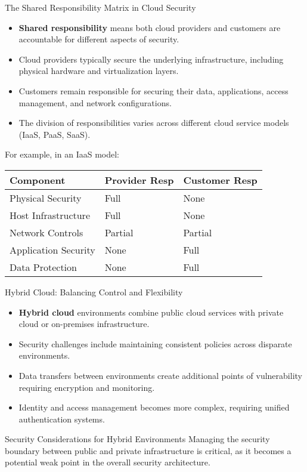 \documentclass{beamer}
\begin{document}
\begin{frame}{The Shared Responsibility Matrix in Cloud Security}
    \begin{itemize}
    \item \textbf{Shared responsibility} means both cloud providers and customers are accountable for different aspects of security.
    \item Cloud providers typically secure the underlying infrastructure, including physical hardware and virtualization layers.
    \item Customers remain responsible for securing their data, applications, access management, and network configurations.
    \item The division of responsibilities varies across different cloud service models (IaaS, PaaS, SaaS). 
    \end{itemize}
    For example, in an IaaS model:
    \begin{table}
    \begin{tabular}{lll}
    \toprule
    \textbf{Component} & \textbf{Provider Resp} & \textbf{Customer Resp} \\
    \midrule
    Physical Security & Full & None \\
    Host Infrastructure & Full & None \\
    Network Controls & Partial & Partial \\
    Application Security & None & Full \\
    Data Protection & None & Full \\
    \bottomrule
    \end{tabular}
    \end{table}
    \end{frame}
    
    \begin{frame}{Hybrid Cloud: Balancing Control and Flexibility}
    \begin{itemize}
    \item \textbf{Hybrid cloud} environments combine public cloud services with private cloud or on-premises infrastructure.
    \item Security challenges include maintaining consistent policies across disparate environments.
    \item Data transfers between environments create additional points of vulnerability requiring encryption and monitoring.
    \item Identity and access management becomes more complex, requiring unified authentication systems.
    \end{itemize}
    
    \begin{block}{Security Considerations for Hybrid Environments}
    Managing the security boundary between public and private infrastructure is critical, as it becomes a potential weak point in the overall security architecture.
    \end{block}
    \end{frame}
    
\end{document}
